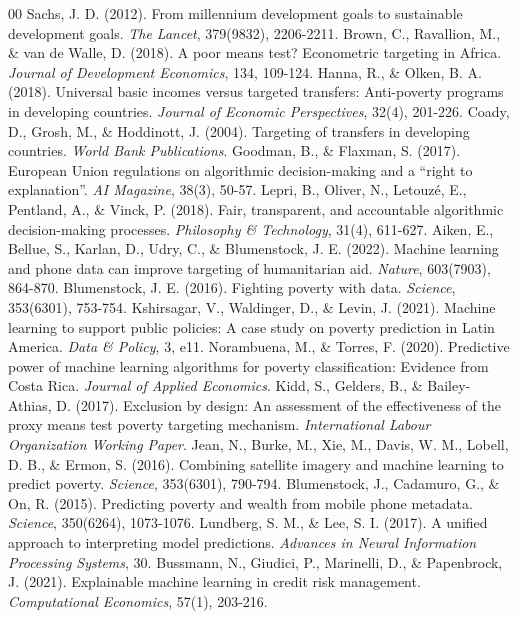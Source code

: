 \documentclass[conference]{IEEEtran}
\begin{document}
\FloatBarrier
\begin{thebibliography}{00}
 Sachs, J. D. (2012). From millennium development goals to sustainable development goals. \textit{The Lancet}, 379(9832), 2206-2211.
 Brown, C., Ravallion, M., \& van de Walle, D. (2018). A poor means test? Econometric targeting in Africa. \textit{Journal of Development Economics}, 134, 109-124.
 Hanna, R., \& Olken, B. A. (2018). Universal basic incomes versus targeted transfers: Anti-poverty programs in developing countries. \textit{Journal of Economic Perspectives}, 32(4), 201-226.
 Coady, D., Grosh, M., \& Hoddinott, J. (2004). Targeting of transfers in developing countries. \textit{World Bank Publications}.
 Goodman, B., \& Flaxman, S. (2017). European Union regulations on algorithmic decision-making and a ``right to explanation''. \textit{AI Magazine}, 38(3), 50-57.
 Lepri, B., Oliver, N., Letouzé, E., Pentland, A., \& Vinck, P. (2018). Fair, transparent, and accountable algorithmic decision-making processes. \textit{Philosophy \& Technology}, 31(4), 611-627.
 Aiken, E., Bellue, S., Karlan, D., Udry, C., \& Blumenstock, J. E. (2022). Machine learning and phone data can improve targeting of humanitarian aid. \textit{Nature}, 603(7903), 864-870.
 Blumenstock, J. E. (2016). Fighting poverty with data. \textit{Science}, 353(6301), 753-754.
 Kshirsagar, V., Waldinger, D., \& Levin, J. (2021). Machine learning to support public policies: A case study on poverty prediction in Latin America. \textit{Data \& Policy}, 3, e11.
 Norambuena, M., \& Torres, F. (2020). Predictive power of machine learning algorithms for poverty classification: Evidence from Costa Rica. \textit{Journal of Applied Economics}.
 Kidd, S., Gelders, B., \& Bailey-Athias, D. (2017). Exclusion by design: An assessment of the effectiveness of the proxy means test poverty targeting mechanism. \textit{International Labour Organization Working Paper}.
 Jean, N., Burke, M., Xie, M., Davis, W. M., Lobell, D. B., \& Ermon, S. (2016). Combining satellite imagery and machine learning to predict poverty. \textit{Science}, 353(6301), 790-794.
 Blumenstock, J., Cadamuro, G., \& On, R. (2015). Predicting poverty and wealth from mobile phone metadata. \textit{Science}, 350(6264), 1073-1076.
 Lundberg, S. M., \& Lee, S. I. (2017). A unified approach to interpreting model predictions. \textit{Advances in Neural Information Processing Systems}, 30.
 Bussmann, N., Giudici, P., Marinelli, D., \& Papenbrock, J. (2021). Explainable machine learning in credit risk management. \textit{Computational Economics}, 57(1), 203-216.

\end{thebibliography}
\end{document}

